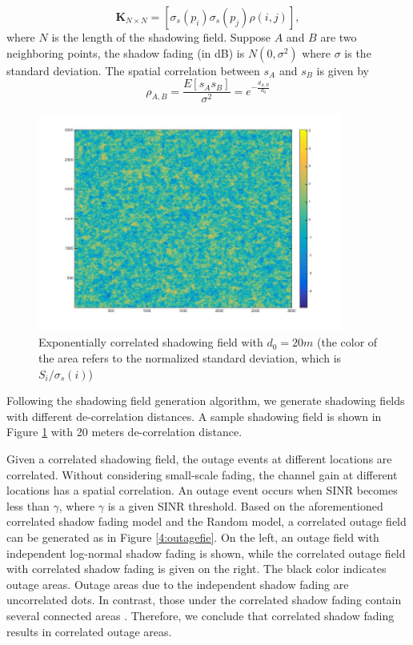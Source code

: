  \begin{equation}
 \mathbf{K}_{N\times N} = [ \sigma_{s}(p_{i})\sigma_{s}(p_{j})\rho(i,j)],
 \label{correlationmatrix}
 \end{equation}
 where $N$ is the length of the shadowing field. Suppose $A$ and $B$ are two neighboring points, the shadow fading (in dB) is $N(0,\sigma^2)$ where $\sigma$ is the standard deviation. The spatial correlation between $s_{A}$ and $s_{B}$ is given by 
 \begin{equation}
 \rho_{A,B} = \frac{E[s_{A}s_{B}]}{\sigma^2} =e^{-\frac{d_{A,B}}{d_{0}}}
 \end{equation}
 \begin{figure}
 \centering
 \includegraphics[width = 10cm]{ShadowFieldDeCorr20.jpg}
 \caption{Exponentially correlated shadowing field with $d_{0} = 20m$ (the color of the area refers to the normalized standard deviation, which is $S_{i}/\sigma_{s}(i)$)}

 \label{ch4:shadowingfield}
 \end{figure}

 Following the shadowing field generation algorithm, we generate shadowing fields with different de-correlation distances. A sample shadowing field is shown in Figure \ref{ch4:shadowingfield} with 20 meters de-correlation distance.

 \par Given a correlated shadowing field, the outage events at different locations are correlated. Without considering small-scale fading, the channel gain at different locations has a spatial correlation. An outage event occurs when SINR becomes less than $\gamma$, where $\gamma$ is a given SINR threshold. Based on the aforementioned correlated shadow fading model and the Random model, a correlated outage field can be generated as in Figure \ref{4:outagefie}. On the left, an outage field with independent log-normal shadow fading is shown, while the correlated outage field with correlated shadow fading is given on the right. The black color indicates outage areas. Outage areas due to the independent shadow fading are uncorrelated dots. In contrast, those under the correlated shadow fading contain several connected areas . Therefore, we conclude that correlated shadow fading results in correlated outage areas.

